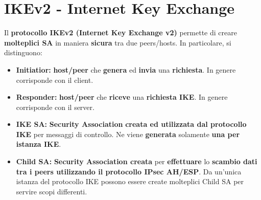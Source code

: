 \section{IKEv2 - Internet Key Exchange}
\begin{definition}[IKEv2]\label{def:ikev2}
Il \textbf{protocollo IKEv2 (Internet Key Exchange v2)} permette di creare \textbf{molteplici SA} in maniera \textbf{sicura} tra due peers/hosts. In particolare, si distinguono:
\begin{itemize}
    \item \textbf{Initiatior:} \textbf{host/peer} che \textbf{genera} ed \textbf{invia} una \textbf{richiesta}. In genere corrisponde con il client.
    \item \textbf{Responder:} \textbf{host/peer} che \textbf{riceve} una \textbf{richiesta IKE}. In genere corrisponde con il server.
    \item \textbf{IKE SA:} \textbf{Security Association} \textbf{creata ed utilizzata dal protocollo IKE} per messaggi di controllo. Ne viene \textbf{generata} solamente \textbf{una per istanza IKE}.
    \item \textbf{Child SA:} \textbf{Security Association creata} per \textbf{effettuare} lo \textbf{scambio dati tra i peers utilizzando il protocollo IPsec AH/ESP}. Da un’unica istanza del protocollo IKE possono essere create molteplici Child SA per servire scopi differenti.
\end{itemize}
\end{definition}\pagebreak
